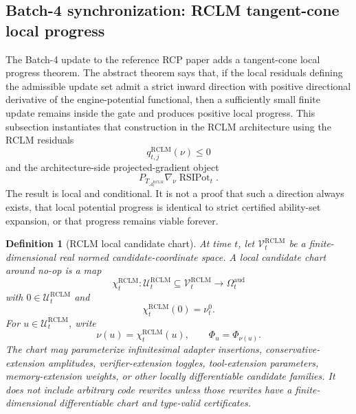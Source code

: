 \documentclass[11pt,a4paper]{article}
\newtheorem{definition}[theorem]{Definition}
\newcommand{\Acal}{\mathcal A}
\newcommand{\RCLM}{\mathrm{RCLM}}
\newcommand{\aud}{\mathrm{aud}}
\newcommand{\RSIPot}{\operatorname{RSIPot}}
\begin{document}
\subsection{Batch-4 synchronization: RCLM tangent-cone local progress}
\label{subsec:batch4-rclm-tangent-cone-progress}

The Batch-4 update to the reference RCP paper adds a tangent-cone local progress theorem.  The abstract theorem says that, if the local residuals defining the admissible update set admit a strict inward direction with positive directional derivative of the engine-potential functional, then a sufficiently small finite update remains inside the gate and produces positive local progress.  This subsection instantiates that construction in the RCLM architecture using the RCLM residuals
\[
q_{t,j}^{\RCLM}(\nu)\le0
\]
and the architecture-side projected-gradient object
\[
P_{T_{\Acal_t^{\RCLM}}}\nabla_\nu \RSIPot_t.
\]
The result is local and conditional.  It is not a proof that such a direction always exists, that local potential progress is identical to strict certified ability-set expansion, or that progress remains viable forever.

\begin{definition}[RCLM local candidate chart]
\label{def:rclm-local-candidate-chart}
At time \(t\), let \(\mathcal V_t^{\RCLM}\) be a finite-dimensional real normed candidate-coordinate space.  A local candidate chart around no-op is a map
\[
\chi_t^{\RCLM}:\mathcal U_t^{\RCLM}\subseteq\mathcal V_t^{\RCLM}\to\Omega_t^{\aud}
\]
with \(0\in\mathcal U_t^{\RCLM}\) and
\[
\chi_t^{\RCLM}(0)=\nu_t^0.
\]
For \(u\in\mathcal U_t^{\RCLM}\), write
\[
\nu(u)=\chi_t^{\RCLM}(u),
\qquad
\Phi_u=\Phi_{\nu(u)}.
\]
The chart may parameterize infinitesimal adapter insertions, conservative-extension amplitudes, verifier-extension toggles, tool-extension parameters, memory-extension weights, or other locally differentiable candidate families.  It does not include arbitrary code rewrites unless those rewrites have a finite-dimensional differentiable chart and type-valid certificates.
\end{definition}
\end{document}
